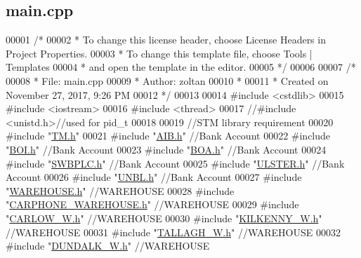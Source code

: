 \hypertarget{main_8cpp_source}{}\subsection{main.\+cpp}

\begin{DoxyCode}
00001 \textcolor{comment}{/*}
00002 \textcolor{comment}{ * To change this license header, choose License Headers in Project Properties.}
00003 \textcolor{comment}{ * To change this template file, choose Tools | Templates}
00004 \textcolor{comment}{ * and open the template in the editor.}
00005 \textcolor{comment}{ */}
00006 
00007 \textcolor{comment}{/*}
00008 \textcolor{comment}{ * File:   main.cpp}
00009 \textcolor{comment}{ * Author: zoltan}
00010 \textcolor{comment}{ *}
00011 \textcolor{comment}{ * Created on November 27, 2017, 9:26 PM}
00012 \textcolor{comment}{ */}
00013 
00014 \textcolor{preprocessor}{#include <cstdlib>}
00015 \textcolor{preprocessor}{#include <iostream>}
00016 \textcolor{preprocessor}{#include <thread>}
00017 \textcolor{comment}{//#include <unistd.h>//used for pid\_t}
00018 
00019 \textcolor{comment}{//STM library requirement}
00020 \textcolor{preprocessor}{#include "\hyperlink{_t_m_8h}{TM.h}"}
00021 \textcolor{preprocessor}{#include "\hyperlink{_a_i_b_8h}{AIB.h}"}    \textcolor{comment}{//Bank Account}
00022 \textcolor{preprocessor}{#include "\hyperlink{_b_o_i_8h}{BOI.h}"}    \textcolor{comment}{//Bank Account}
00023 \textcolor{preprocessor}{#include "\hyperlink{_b_o_a_8h}{BOA.h}"}    \textcolor{comment}{//Bank Account}
00024 \textcolor{preprocessor}{#include "\hyperlink{_s_w_b_p_l_c_8h}{SWBPLC.h}"} \textcolor{comment}{//Bank Account}
00025 \textcolor{preprocessor}{#include "\hyperlink{_u_l_s_t_e_r_8h}{ULSTER.h}"} \textcolor{comment}{//Bank Account}
00026 \textcolor{preprocessor}{#include "\hyperlink{_u_n_b_l_8h}{UNBL.h}"}   \textcolor{comment}{//Bank Account}
00027 \textcolor{preprocessor}{#include "\hyperlink{_w_a_r_e_h_o_u_s_e_8h}{WAREHOUSE.h}"}   \textcolor{comment}{//WAREHOUSE}
00028 \textcolor{preprocessor}{#include "\hyperlink{_c_a_r_p_h_o_n_e___w_a_r_e_h_o_u_s_e_8h}{CARPHONE\_WAREHOUSE.h}"} \textcolor{comment}{//WAREHOUSE}
00029 \textcolor{preprocessor}{#include "\hyperlink{_c_a_r_l_o_w___w_8h}{CARLOW\_W.h}"}    \textcolor{comment}{//WAREHOUSE}
00030 \textcolor{preprocessor}{#include "\hyperlink{_k_i_l_k_e_n_n_y___w_8h}{KILKENNY\_W.h}"}  \textcolor{comment}{//WAREHOUSE}
00031 \textcolor{preprocessor}{#include "\hyperlink{_t_a_l_l_a_g_h___w_8h}{TALLAGH\_W.h}"}   \textcolor{comment}{//WAREHOUSE}
00032 \textcolor{preprocessor}{#include "\hyperlink{_d_u_n_d_a_l_k___w_8h}{DUNDALK\_W.h}"}   \textcolor{comment}{//WAREHOUSE}

\end{DoxyCode}
